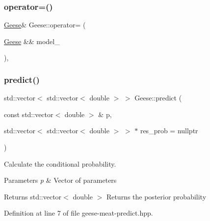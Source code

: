 \mbox{\label{class_geese_a5a56d129d383ca8648e6ddf9b845b05a}} 
\subsubsection{\texorpdfstring{operator=()}{operator=()}\hspace{0.1cm}{\footnotesize\ttfamily [2/2]}}
{\footnotesize\ttfamily \hyperlink{class_geese}{Geese}\& Geese\+::operator= (\begin{DoxyParamCaption}\item[{\hyperlink{class_geese}{Geese} \&\&}]{model\+\_\+ }\end{DoxyParamCaption})\hspace{0.3cm}{\ttfamily [delete]}, {\ttfamily [noexcept]}}

\mbox{\label{class_geese_a36018dcd49e5f761d888fa518a728b08}} 
\subsubsection{\texorpdfstring{predict()}{predict()}}
{\footnotesize\ttfamily std\+::vector$<$ std\+::vector$<$ double $>$ $>$ Geese\+::predict (\begin{DoxyParamCaption}\item[{const std\+::vector$<$ double $>$ \&}]{p,  }\item[{std\+::vector$<$ std\+::vector$<$ double $>$ $>$ $\ast$}]{res\+\_\+prob = {\ttfamily nullptr} }\end{DoxyParamCaption})\hspace{0.3cm}{\ttfamily [inline]}}



Calculate the conditional probability. 


\begin{DoxyParams}{Parameters}
{\em p} & Vector of parameters \\
\hline
\end{DoxyParams}
\begin{DoxyReturn}{Returns}
std\+::vector$<$ double $>$ Returns the posterior probability 
\end{DoxyReturn}


Definition at line 7 of file geese-\/meat-\/predict.\+hpp.

